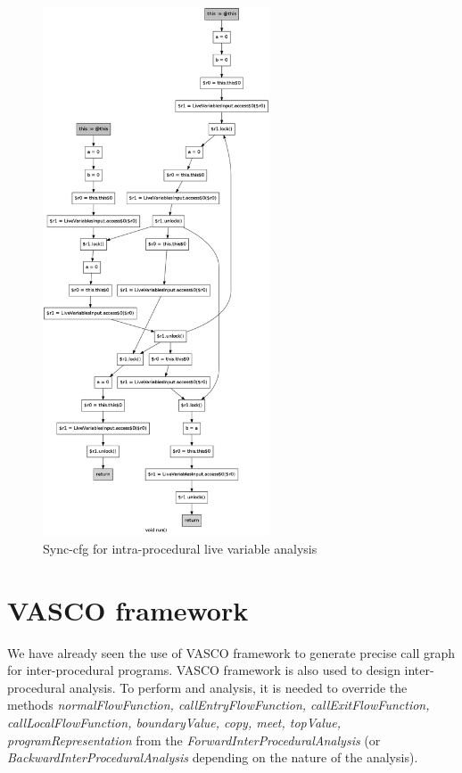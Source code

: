 \begin{figure}
	\centering
	\includegraphics[width=0.6\textwidth]{Figures/combined-cfg.png}
	\caption{Sync-cfg for intra-procedural live variable analysis}
	\label{fig:live var analysis}
\end{figure} 


\section{VASCO framework}

We have already seen the use of VASCO framework to generate precise call graph for inter-procedural programs. VASCO framework is also used to design inter-procedural analysis. To perform and analysis, it is needed to override the methods \emph{normalFlowFunction, callEntryFlowFunction, callExitFlowFunction, callLocalFlowFunction, boundaryValue, copy, meet, topValue, programRepresentation} from the \emph{ForwardInterProceduralAnalysis} (or \emph{BackwardInterProceduralAnalysis} depending on the nature of the analysis).


  



 



